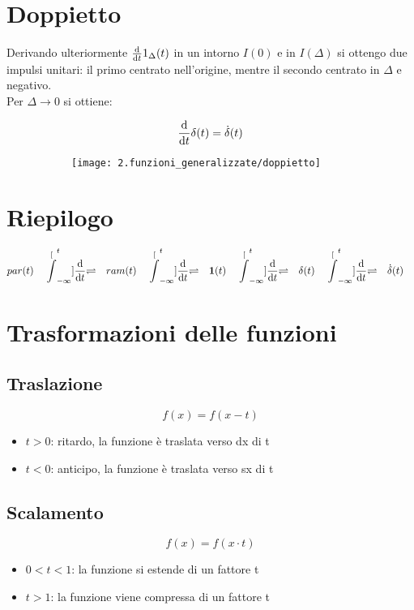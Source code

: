 \documentclass[../main.tex]{subfiles}
\begin{document}
	\section{Doppietto}
		Derivando ulteriormente $\frac{\mathrm{d} }{\mathrm{d} t}1_{\Delta}(t)$ in un intorno $I(0)$ e in $I(\Delta)$ si ottengo due impulsi unitari: il primo centrato nell'origine, mentre il secondo centrato in $\Delta$ e negativo.\\
		Per $\Delta \longrightarrow 0$ si ottiene:
		\begin{figure}[h!]
			\centering
			\begin{subfigure}{0.5\textwidth}
				\[
					\frac{\mathrm{d} }{\mathrm{d} t} \delta(t) = \dot{\delta}(t)
				\]
			\end{subfigure}
			\begin{subfigure}{0.4\textwidth}
				\texttt{[image: 2.funzioni\_generalizzate/doppietto]}
			\end{subfigure}
		\end{figure}
		
	\section{Riepilogo}
		\[
			par(t) \quad \stackrel[\int_{-\infty}^{t}]{\frac{\mathrm{d} }{\mathrm{d} t}}{\rightleftharpoons} 
			\quad ram(t) \quad
			\stackrel[\int_{-\infty}^{t}]{\frac{\mathrm{d} }{\mathrm{d} t}}{\rightleftharpoons}
			\quad \textbf{1}(t) \quad
			\stackrel[\int_{-\infty}^{t}]{\frac{\mathrm{d} }{\mathrm{d} t}}{\rightleftharpoons}
			\quad \delta (t) \quad
			\stackrel[\int_{-\infty}^{t}]{\frac{\mathrm{d} }{\mathrm{d} t}}{\rightleftharpoons}
			\quad \dot{\delta}(t) \quad
		\]
		
	\section{Trasformazioni delle funzioni}
	
	\subsection{Traslazione}
		$$ f(x) = f(x - t) $$
		\begin{itemize}
			\item $ t>0 $: ritardo, la funzione è traslata verso dx di t
			\item $ t<0 $: anticipo, la funzione è traslata verso sx di t 	
		\end{itemize}
		
	\subsection{Scalamento}
		$$ f(x) = f(x \cdot t) $$
		\begin{itemize}
			\item $ 0<t<1 $: la funzione si estende di un fattore t
			\item $ t>1 $: la funzione viene compressa di un fattore t  	
		\end{itemize}
		
\end{document}

